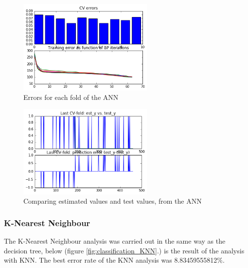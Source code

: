 \vspace{-5pt}
\begin{figure}[h]
	\centering
	\includegraphics[width=0.6\textwidth]{Fig/classification_ANN_1}
	\vspace{-5pt}
	\caption{Errors for each fold of the ANN}
	\label{fig:classification_ANN}
\end{figure}

\vspace{-5pt}
\begin{figure}[h]
	\centering
	\includegraphics[width=0.6\textwidth]{Fig/classification_ANN_2}
	\vspace{-5pt}
	\caption{Comparing estimated values and test values, from the ANN}
	\label{fig:classification_ANN2}
\end{figure}

\newpage
\subsubsection{K-Nearest Neighbour}
The K-Nearest Neighbour analysis was carried out in the same way as the decision tree, below (figure \ref{fig:classification_KNN}.) is the result of the analysis with KNN. The best error rate of the KNN analysis was 8.83459555812\%.


